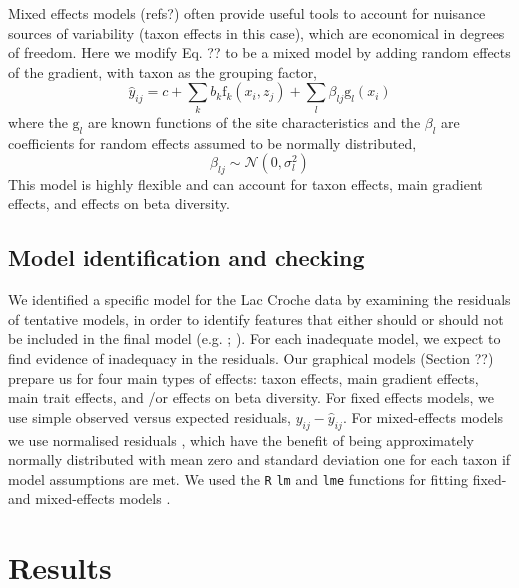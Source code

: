\documentclass[12pt]{ecology}
\begin{document}
Mixed effects models (refs?) often provide useful tools to account for nuisance sources of variability (taxon effects in this case), which are economical in degrees of freedom.  Here we modify Eq. ?? to be a mixed model by adding random effects of the gradient, with taxon as the grouping factor,
\begin{equation}
\hat{y}_{ij} = c + 
	\sum_k b_k \mathrm{f}_k (x_i, z_j) + 
	\sum_l \beta_{lj} \mathrm{g}_l (x_i)
\end{equation}
where the $\mathrm{g}_l$ are known functions of the site characteristics and the $\beta_l$ are coefficients for random effects assumed to be normally distributed,
\begin{equation}
\beta_{lj} \sim \mathcal{N}(0,\sigma_l^2)
\end{equation}
This model is highly flexible and can account for taxon effects, main gradient effects, and effects on beta diversity.

\subsection{Model identification and checking}

We identified a specific model for the Lac Croche data by examining the residuals of tentative models, in order to identify features that either should or should not be included in the final model (e.g. ; ).  For each inadequate model, we expect to find evidence of inadequacy in the residuals.  Our graphical models (Section ??) prepare us for four main types of effects:  taxon effects, main gradient effects, main trait effects, and /or effects on beta diversity.  For fixed effects models, we use simple observed versus expected residuals, $y_{ij} - \hat{y}_{ij}$.    For mixed-effects models we use normalised residuals \citep{PinheiroAndBates2000}, which have the benefit of being approximately normally distributed with mean zero and standard deviation one for each taxon if model assumptions are met.  We used the \texttt{R} \texttt{lm} and \texttt{lme} functions for fitting fixed- and mixed-effects models \citep{R2009}.

\section{Results}
\end{document}
